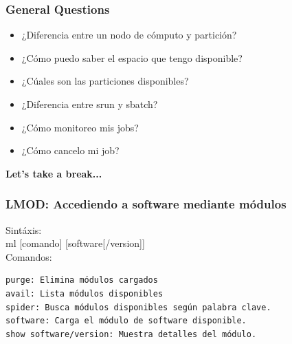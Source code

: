 \documentclass[aspectratio=169,professionalfonts]{beamer}
\newenvironment{minted}[2][]{\VerbatimEnvironment\begin{Verbatim}[#1]}{\end{Verbatim}}
\begin{document}
\begin{frame}[fragile]
\frametitle{\textbf{General Questions}}
\begin{itemize}
    \item ¿Diferencia entre un nodo de cómputo y partición?
     \vspace{0.5em} 
    \item ¿Cómo puedo saber el espacio que tengo disponible?
     \vspace{0.5em} 
    \item ¿Cúales son las particiones disponibles?
     \vspace{0.5em} 
    \item ¿Diferencia entre srun y sbatch?
     \vspace{0.5em} 
    \item ¿Cómo monitoreo mis jobs?
     \vspace{0.5em} 
    \item ¿Cómo cancelo mi job?
\end{itemize}
    
\end{frame}

\begin{frame}[fragile]

\vspace{0.5em} 
\textbf{Let's take a break...}
    
\end{frame}


\begin{frame}[fragile]
\frametitle{\textbf{LMOD: Accediendo a software mediante módulos}}
  Sintáxis: \\ 
  ml [comando]  [software[/version]] \\ 
  Comandos: \\ 

\begin{verbatim}
purge: Elimina módulos cargados  
avail: Lista módulos disponibles  
spider: Busca módulos disponibles según palabra clave.
software: Carga el módulo de software disponible. 
show software/version: Muestra detalles del módulo.
\end{verbatim}

\end{frame}
\end{document}
